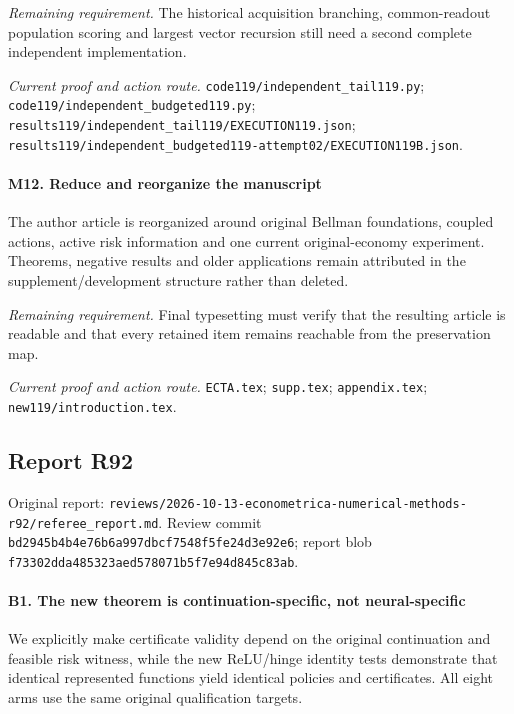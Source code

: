 \par\emph{Remaining requirement.} The historical acquisition branching, common-readout population scoring and largest vector recursion still need a second complete independent implementation.

\par\emph{Current proof and action route.} \nolinkurl{code119/independent_tail119.py}; \nolinkurl{code119/independent_budgeted119.py}; \nolinkurl{results119/independent_tail119/EXECUTION119.json}; \nolinkurl{results119/independent_budgeted119-attempt02/EXECUTION119B.json}.

\paragraph{M12. Reduce and reorganize the manuscript}

The author article is reorganized around original Bellman foundations, coupled actions, active risk information and one current original-economy experiment. Theorems, negative results and older applications remain attributed in the supplement/\allowbreak{}development structure rather than deleted.

\par\emph{Remaining requirement.} Final typesetting must verify that the resulting article is readable and that every retained item remains reachable from the preservation map.

\par\emph{Current proof and action route.} \nolinkurl{ECTA.tex}; \nolinkurl{supp.tex}; \nolinkurl{appendix.tex}; \nolinkurl{new119/introduction.tex}.

\subsection{Report R92}

Original report: \nolinkurl{reviews/2026-10-13-econometrica-numerical-methods-r92/referee_report.md}. Review commit \nolinkurl{bd2945b4b4e76b6a997dbcf7548f5fe24d3e92e6}; report blob \nolinkurl{f73302dda485323aed578071b5f7e94d845c83ab}.

\paragraph{B1. The new theorem is continuation-specific, not neural-specific}

We explicitly make certificate validity depend on the original continuation and feasible risk witness, while the new ReLU/\allowbreak{}hinge identity tests demonstrate that identical represented functions yield identical policies and certificates. All eight arms use the same original qualification targets.

